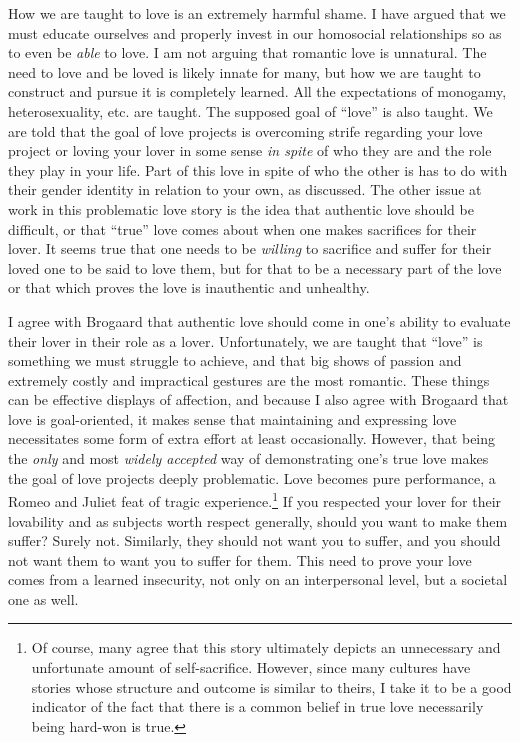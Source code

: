 How we are taught to love is an extremely harmful shame. I have argued
that we must educate ourselves and properly invest in our homosocial
relationships so as to even be \emph{able} to love. I am not arguing
that romantic love is unnatural. The need to love and be loved is likely
innate for many, but how we are taught to construct and pursue it is
completely learned. All the expectations of monogamy, heterosexuality,
etc. are taught. The supposed goal of ``love'' is also taught. We are
told that the goal of love projects is overcoming strife regarding your
love project or loving your lover in some sense \emph{in spite} of who
they are and the role they play in your life. Part of this love in spite
of who the other is has to do with their gender identity in relation to
your own, as discussed. The other issue at work in this problematic love
story is the idea that authentic love should be difficult, or that
``true'' love comes about when one makes sacrifices for their lover. It
seems true that one needs to be \emph{willing} to sacrifice and suffer
for their loved one to be said to love them, but for that to be a
necessary part of the love or that which proves the love is inauthentic
and unhealthy.

I agree with Brogaard that authentic love should come in one's ability
to evaluate their lover in their role as a lover. Unfortunately, we are
taught that ``love'' is something we must struggle to achieve, and that
big shows of passion and extremely costly and impractical gestures are
the most romantic. These things can be effective displays of affection,
and because I also agree with Brogaard that love is goal-oriented, it
makes sense that maintaining and expressing love necessitates some form
of extra effort at least occasionally. However, that being the
\emph{only} and most \emph{widely accepted} way of demonstrating one's
true love makes the goal of love projects deeply problematic. Love
becomes pure performance, a Romeo and Juliet feat of tragic
experience.\footnote{Of course, many agree that this story ultimately
  depicts an unnecessary and unfortunate amount of self-sacrifice.
  However, since many cultures have stories whose structure and outcome
  is similar to theirs, I take it to be a good indicator of the fact
  that there is a common belief in true love necessarily being hard-won
  is true.} If you respected your lover for their lovability and as
subjects worth respect generally, should you want to make them suffer?
Surely not. Similarly, they should not want you to suffer, and you
should not want them to want you to suffer for them. This need to prove
your love comes from a learned insecurity, not only on an interpersonal
level, but a societal one as well.


